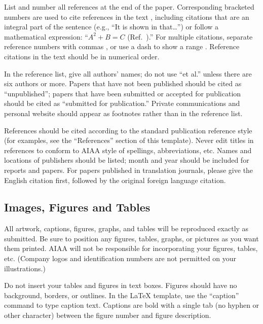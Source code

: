 \documentclass[conf]{new-aiaa}
\begin{document}
List and number all references at the end of the paper. Corresponding bracketed numbers are used to cite references in the text \cite{vatistas1986reverse}, including citations that are an integral part of the sentence (e.g., ``It is shown in \cite{dornheim1996planetary} that\ldots '') or follow a mathematical expression: ``$A^{2} + B = C$ (Ref.~\cite{terster1997nasa}).'' For multiple citations, separate reference numbers with commas \cite{peyret2012computational,oates1997aerothermodynamics}, or use a dash to show a range \cite{volpe1994techniques,thompsonspacecraft,chi1993fluid}. Reference citations in the text should be in numerical order.

In the reference list, give all authors' names; do not use ``et al.'' unless there are six authors or more. Papers that have not been published should be cited as ``unpublished''; papers that have been submitted or accepted for publication should be cited as ``submitted for publication.'' Private communications and personal website should appear as footnotes rather than in the reference list.

References should be cited according to the standard publication reference style (for examples, see the ``References'' section of this template). Never edit titles in references to conform to AIAA style of spellings, abbreviations, etc. Names and locations of publishers should be listed; month and year should be included for reports and papers. For papers published in translation journals, please give the English citation first, followed by the original foreign language citation.

\subsection{Images, Figures and Tables}
All artwork, captions, figures, graphs, and tables will be reproduced exactly as submitted. Be sure to position any figures, tables, graphs, or pictures as you want them printed. AIAA will not be responsible for incorporating your figures, tables, etc. (Company logos and identification numbers are not permitted on your illustrations.)

Do not insert your tables and figures in text boxes. Figures should have no background, borders, or outlines. In the \LaTeX{} template, use the ``caption'' command to type caption text. Captions are bold with a single tab (no hyphen or other character) between the figure number and figure description.
\end{document}
